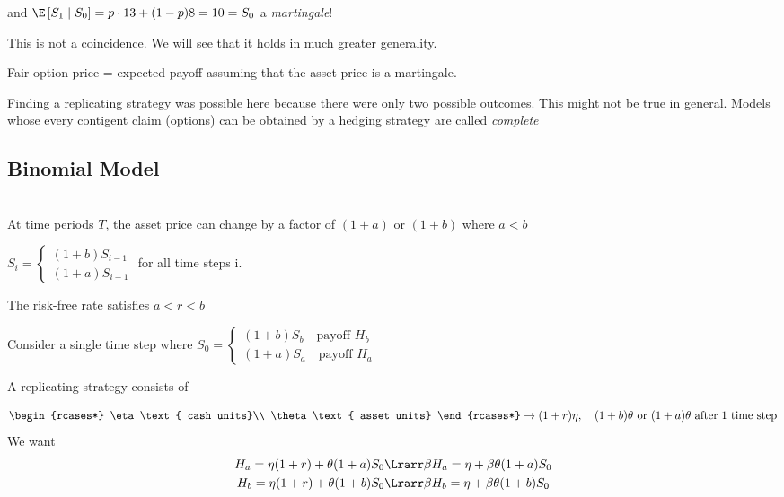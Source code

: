 \noindent and $\E\left[S_1\mid S_0\right] = p\cdot13+(1-p)8=10=S_0$ a \textit{martingale}!
\par\bigskip
\noindent This is not a coincidence. We will see that it holds in much greater generality.
\par\bigskip
\noindent Fair option price = expected payoff assuming that the asset price is a martingale.
\par\bigskip
\noindent Finding a replicating strategy was possible here because there were only two possible outcomes. This might not be true in general. Models whose every contigent claim (options) can be obtained by a hedging strategy are called \textit{complete}
\par\bigskip
\subsection{Binomial Model}\hfill\\
\noindent At time periods $T$, the asset price can change by a factor of $(1+a)$ or $(1+b)$ where $a<b$\par
\noindent $S_i = \begin{cases}
  (1+b)S_{i-1}\\(1+a)S_{i-1}
\end{cases}$ for all time steps i.\par
\noindent The risk-free rate satisfies $a<r<b$
\par\bigskip
\noindent Consider a single time step where $S_0= \begin{cases}
  (1+b)S_b\quad\text{payoff } H_b\\(1+a)S_a\quad\text{payoff } H_a
\end{cases}$\par
\noindent A replicating strategy consists of\par
\begin{equation*}
  \begin{gathered}
    \begin{rcases*}
      \eta\text{ cash units}\\
      \theta\text{ asset units}
    \end{rcases*}\rightarrow (1+r)\eta,\quad (1+b)\theta \text{ or } (1+a)\theta \text{ after 1 time step}
  \end{gathered}
\end{equation*}
\noindent We want
\begin{equation*}
  \begin{gathered}
    H_a = \eta(1+r)+\theta(1+a)S_0\Lrarr \beta H_a=\eta+\beta\theta(1+a)S_0\\
    H_b = \eta(1+r)+\theta(1+b)S_0\Lrarr\beta H_b = \eta+\beta\theta(1+b)S_0
  \end{gathered}
\end{equation*}\par
